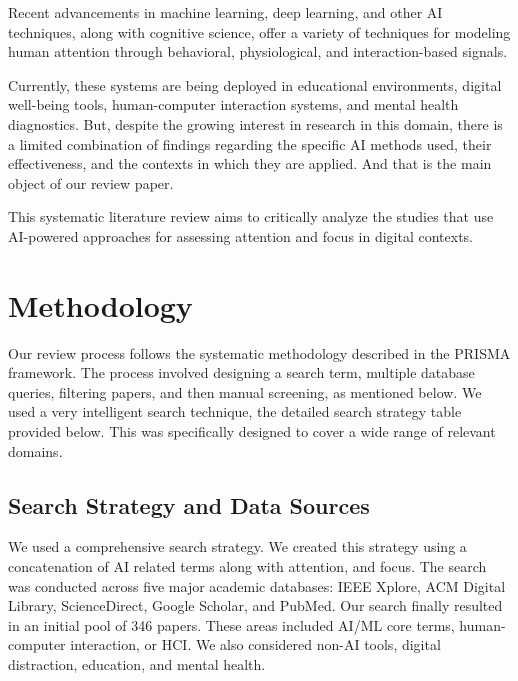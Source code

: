 \documentclass[twocolumn,12pt]{article}
\begin{document}
Recent advancements in machine learning, deep learning, and other AI techniques, along with cognitive science, offer a variety of techniques for modeling human attention through behavioral, physiological, and interaction-based signals.

Currently, these systems are being deployed in educational environments, digital well-being tools, human-computer interaction systems, and mental health diagnostics. But, despite the growing interest in research in this domain, there is a limited combination of findings regarding the specific AI methods used, their effectiveness, and the contexts in which they are applied. And that is the main object of our review paper.

This systematic literature review aims to critically analyze the studies that use AI-powered approaches for assessing attention and focus in digital contexts.

\section{Methodology}
Our review process follows the systematic methodology described in the PRISMA framework. The process involved designing a search term, multiple database queries, filtering papers, and then manual screening, as mentioned below. We used a very intelligent search technique, the detailed search strategy table provided below. This was specifically designed to cover a wide range of relevant domains.

\subsection{Search Strategy and Data Sources} 
We used a comprehensive search strategy. We created this strategy using a concatenation of AI related terms along with attention, and focus. The search was conducted across five major academic databases: IEEE Xplore, ACM Digital Library, ScienceDirect, Google Scholar, and PubMed. Our search finally resulted in an initial pool of 346 papers. These areas included AI/ML core terms, human-computer interaction, or HCI. We also considered non-AI tools, digital distraction, education, and mental health. \\
\end{document}
